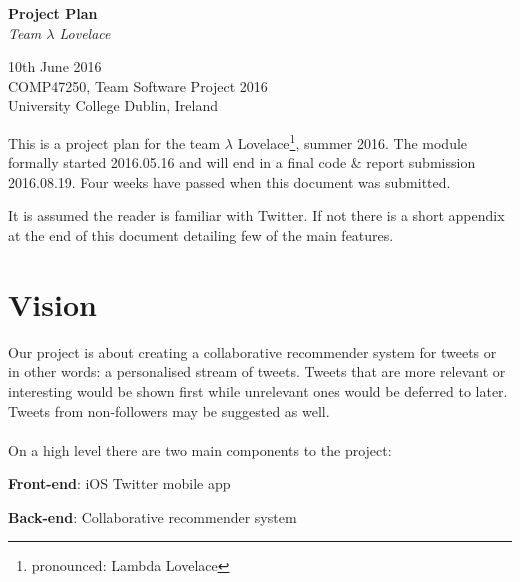 \documentclass{article}
\begin{document}
\begin{center}
	{\LARGE \textbf{Project Plan}} \\
	\vspace{0.5em}
	\textsl{Team $\lambda$ Lovelace}
\end{center}

\vspace{0.5em}

\begin{center}
	10th June 2016 \\
	COMP47250, Team Software Project 2016 \\ 
	University College Dublin, Ireland \\
\end{center}

\vspace{0.5em}



\noindent This is a project plan for the team $\lambda$ Lovelace\footnote{pronounced: Lambda Lovelace}, summer 2016. The module formally started 2016.05.16 and will end in a final code \& report submission 2016.08.19. Four weeks have passed when this document was submitted.

It is assumed the reader is familiar with Twitter. If not there is a short appendix at the end of this document detailing few of the main features.


\section{Vision}

Our project is about creating a collaborative recommender system for tweets or in other words: a personalised stream of tweets. Tweets that are more relevant or interesting would be shown first while unrelevant ones would be deferred to later. Tweets from non-followers may be suggested as well.
\\\\
On a high level there are two main components to the project:

\begin{itemize*}
	\item \textbf{Front-end}: iOS Twitter mobile app
	\item \textbf{Back-end}: Collaborative recommender system
\end{itemize*}
\end{document}
